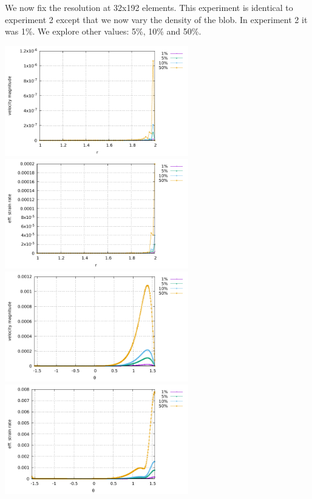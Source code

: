 We now fix the resolution at 32x192 elements. This experiment is identical to experiment 2
except that we now vary the density of the blob. In experiment 2 it was 1\%. We explore other values:
5\%, 10\% and 50\%.

\begin{center}
\includegraphics[width=8cm]{python_codes/fieldstone_152/results/exp3_axisymmetric/vel_left}
\includegraphics[width=8cm]{python_codes/fieldstone_152/results/exp3_axisymmetric/sr2_left}\\
\includegraphics[width=8cm]{python_codes/fieldstone_152/results/exp3_axisymmetric/vel_R2}
\includegraphics[width=8cm]{python_codes/fieldstone_152/results/exp3_axisymmetric/sr2_R2}\\

\end{center}
